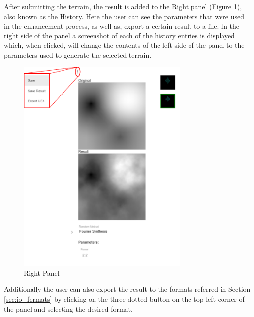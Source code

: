    After submitting the terrain, the result is added to the Right panel (Figure \ref{fig:rightbar}), also known as the History. Here the user can see the parameters that were used in the enhancement process, as well as, export a certain result to a file. In the right side of the panel a screenshot of each of the history entries is displayed which, when clicked, will change the contents of the left side of the panel to the parameters used to generate the selected terrain. 
    
    \begin{figure}[H]
    	\centering
    	\includegraphics[width=0.75\textwidth]{images/screenshots/RightBar-WithMenu-1}
    	\caption{Right Panel}
    	\label{fig:rightbar}
    \end{figure}
    
    Additionally the user can also export the result to the formats referred in Section \ref{sec:io_formats} by clicking on the three dotted button on the top left corner of the panel and selecting the desired format.
  
    
  
  
  
  
